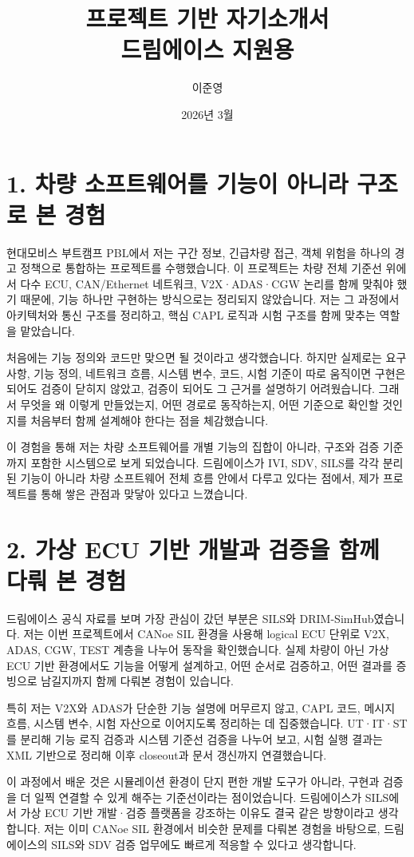 \documentclass[11pt]{article}
\title{\textbf{프로젝트 기반 자기소개서}\\드림에이스 지원용}
\author{이준영}
\date{2026년 3월}
\begin{document}
\maketitle

\section*{1. 차량 소프트웨어를 기능이 아니라 구조로 본 경험}
현대모비스 부트캠프 PBL에서 저는 구간 정보, 긴급차량 접근, 객체 위험을 하나의 경고 정책으로 통합하는 프로젝트를 수행했습니다. 이 프로젝트는 차량 전체 기준선 위에서 다수 ECU, CAN/Ethernet 네트워크, V2X·ADAS·CGW 논리를 함께 맞춰야 했기 때문에, 기능 하나만 구현하는 방식으로는 정리되지 않았습니다. 저는 그 과정에서 아키텍처와 통신 구조를 정리하고, 핵심 CAPL 로직과 시험 구조를 함께 맞추는 역할을 맡았습니다.

처음에는 기능 정의와 코드만 맞으면 될 것이라고 생각했습니다. 하지만 실제로는 요구사항, 기능 정의, 네트워크 흐름, 시스템 변수, 코드, 시험 기준이 따로 움직이면 구현은 되어도 검증이 닫히지 않았고, 검증이 되어도 그 근거를 설명하기 어려웠습니다. 그래서 무엇을 왜 이렇게 만들었는지, 어떤 경로로 동작하는지, 어떤 기준으로 확인할 것인지를 처음부터 함께 설계해야 한다는 점을 체감했습니다.

이 경험을 통해 저는 차량 소프트웨어를 개별 기능의 집합이 아니라, 구조와 검증 기준까지 포함한 시스템으로 보게 되었습니다. 드림에이스가 IVI, SDV, SILS를 각각 분리된 기능이 아니라 차량 소프트웨어 전체 흐름 안에서 다루고 있다는 점에서, 제가 프로젝트를 통해 쌓은 관점과 맞닿아 있다고 느꼈습니다.

\section*{2. 가상 ECU 기반 개발과 검증을 함께 다뤄 본 경험}
드림에이스 공식 자료를 보며 가장 관심이 갔던 부분은 SILS와 DRIM-SimHub였습니다. 저는 이번 프로젝트에서 CANoe SIL 환경을 사용해 logical ECU 단위로 V2X, ADAS, CGW, TEST 계층을 나누어 동작을 확인했습니다. 실제 차량이 아닌 가상 ECU 기반 환경에서도 기능을 어떻게 설계하고, 어떤 순서로 검증하고, 어떤 결과를 증빙으로 남길지까지 함께 다뤄본 경험이 있습니다.

특히 저는 V2X와 ADAS가 단순한 기능 설명에 머무르지 않고, CAPL 코드, 메시지 흐름, 시스템 변수, 시험 자산으로 이어지도록 정리하는 데 집중했습니다. UT·IT·ST를 분리해 기능 로직 검증과 시스템 기준선 검증을 나누어 보고, 시험 실행 결과는 XML 기반으로 정리해 이후 closeout과 문서 갱신까지 연결했습니다.

이 과정에서 배운 것은 시뮬레이션 환경이 단지 편한 개발 도구가 아니라, 구현과 검증을 더 일찍 연결할 수 있게 해주는 기준선이라는 점이었습니다. 드림에이스가 SILS에서 가상 ECU 기반 개발·검증 플랫폼을 강조하는 이유도 결국 같은 방향이라고 생각합니다. 저는 이미 CANoe SIL 환경에서 비슷한 문제를 다뤄본 경험을 바탕으로, 드림에이스의 SILS와 SDV 검증 업무에도 빠르게 적응할 수 있다고 생각합니다.
\end{document}
